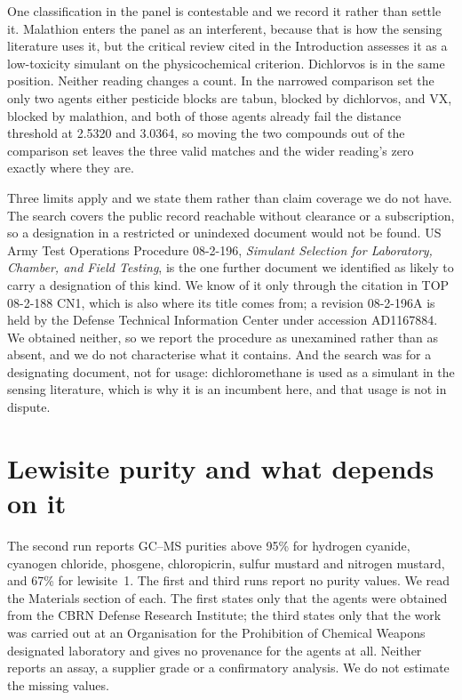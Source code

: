 \documentclass[journal=jacsat,manuscript=suppinfo,margin=1in]{achemso}
\begin{document}


One classification in the panel is contestable and we record it rather than
settle it. Malathion enters the panel as an interferent, because that is how
the sensing literature uses it, but the critical review cited in the
Introduction assesses it as a low-toxicity simulant on the physicochemical
criterion.\cite{webb2025} Dichlorvos is in the same position. Neither
reading changes a count. In the narrowed comparison set the only two agents
either pesticide blocks are tabun, blocked by dichlorvos, and VX, blocked by
malathion, and both of those agents already fail the distance threshold at
2.5320 and 3.0364, so moving the two compounds out of the comparison set
leaves the three valid matches and the wider reading's zero exactly where
they are.

Three limits apply and we state them rather than claim coverage we do not
have. The search covers the public record reachable without clearance or a
subscription, so a designation in a restricted or unindexed document would
not be found. US Army Test Operations Procedure 08-2-196, \emph{Simulant
Selection for Laboratory, Chamber, and Field Testing}, is the one further
document we identified as likely to carry a designation of this
kind.\cite{top082196} We know of it only through the citation in TOP
08-2-188 CN1, which is also where its title comes from; a revision 08-2-196A
is held by the Defense Technical Information Center under accession
AD1167884. We obtained neither, so we report the procedure as unexamined
rather than as absent, and we do not characterise what it contains. And the search was for a
designating document, not for usage: dichloromethane is used as a simulant
in the sensing literature, which is why it is an incumbent here, and that
usage is not in dispute.

\section{Lewisite purity and what depends on it}
\label{meth:purity}

The second run reports GC--MS purities above 95\% for hydrogen cyanide,
cyanogen chloride, phosgene, chloropicrin, sulfur mustard and nitrogen
mustard, and 67\% for lewisite~1.\cite{multiplexref} The first and third runs
report no purity values. We read the Materials section of each. The first
states only that the agents were obtained from the CBRN Defense Research
Institute\cite{hazref}; the third states only that the work was carried out
at an Organisation for the Prohibition of Chemical Weapons designated
laboratory and gives no provenance for the agents at all\cite{group3ref}.
Neither reports an assay, a supplier grade or a confirmatory analysis. We do
not estimate the missing values.
\end{document}
